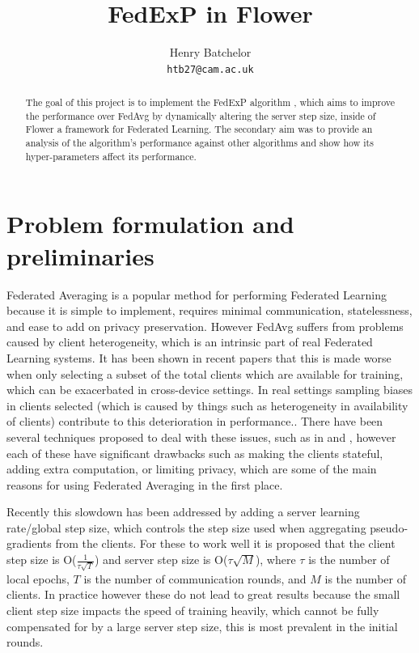 \documentclass{article}
\title{FedExP in Flower}
\author{%
  Henry Batchelor\\
  \texttt{htb27@cam.ac.uk} \\
}
\begin{document}
\maketitle

\begin{abstract}
  The goal of this project is to implement the FedExP algorithm \cite{FedExP}, which aims to improve the performance over FedAvg by dynamically altering the server step size, inside of Flower \cite{flower} a framework for Federated Learning.  The secondary aim was to provide an analysis of the algorithm's performance against other algorithms and show how its hyper-parameters affect its performance.
\end{abstract}

\section{Problem formulation and preliminaries}

Federated Averaging is a popular method for performing Federated Learning because it is simple to implement, requires minimal communication, statelessness, and ease to add on privacy preservation.  However FedAvg suffers from problems caused by client heterogeneity, which is an intrinsic part of real Federated Learning systems.  It has been shown in recent papers \cite{FewerClientsWorseBehaviour} that this is made worse when only selecting a subset of the total clients which are available for training, which can be exacerbated in cross-device settings.  In real settings sampling biases in clients selected (which is caused by things such as heterogeneity in availability of clients) contribute to this deterioration in performance..  There have been several techniques proposed to deal with these issues, such as in \cite{signSGD} and \cite{ProxSkip}, however each of these have significant drawbacks such as making the clients stateful, adding extra computation, or limiting privacy, which are some of the main reasons for using Federated Averaging in the first place.  

Recently this slowdown has been addressed by adding a server learning rate/global step size, which controls the step size used when aggregating pseudo-gradients from the clients. \cite{AdaptiveFederatedOptimisation}  For these to work well it is proposed that the client step size is O($\frac{1}{\tau\sqrt{T}}$) and server step size is O($\tau\sqrt{M}$), where $\tau$ is the number of local epochs, $T$ is the number of communication rounds, and $M$ is the number of clients.  In practice however these do not lead to great results because the small client step size impacts the speed of training heavily, which cannot be fully compensated for by a large server step size, this is most prevalent in the initial rounds.
\end{document}
